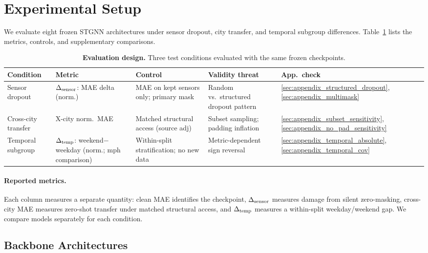 \section{Experimental Setup}
\label{sec:setup}

We evaluate eight frozen STGNN architectures under sensor dropout, city transfer, and temporal subgroup differences. Table~\ref{tab:audit_design} lists the metrics, controls, and supplementary comparisons.

\begin{table}[H]
\centering
\caption{\textbf{Evaluation design.} Three test conditions evaluated
with the same frozen checkpoints.}
\label{tab:audit_design}
\vskip 0.05in
\small
\begin{tabular}{p{2.3cm}p{2.6cm}p{2.6cm}p{2.8cm}p{1.5cm}}
\toprule
\textbf{Condition} & \textbf{Metric} & \textbf{Control} & \textbf{Validity threat} & \textbf{App.\ check} \\
\midrule
Sensor dropout &
  $\Delta_{\text{sensor}}$: MAE delta (norm.) &
  MAE on kept sensors only; primary mask &
  Random vs.\ structured dropout pattern &
  \ref{sec:appendix_structured_dropout}, \ref{sec:appendix_multimask} \\
Cross-city transfer &
  X-city norm.\ MAE &
  Matched structural access (source adj) &
  Subset sampling; padding inflation &
  \ref{sec:appendix_subset_sensitivity}, \ref{sec:appendix_no_pad_sensitivity} \\
Temporal subgroup &
  $\Delta_{\text{temp}}$: weekend$-$weekday (norm.; mph comparison) &
  Within-split stratification; no new data &
  Metric-dependent sign reversal &
  \ref{sec:appendix_temporal_absolute}, \ref{sec:appendix_temporal_cov} \\
\bottomrule
\end{tabular}
\end{table}

\paragraph{Reported metrics.}
Each column measures a separate quantity: clean MAE identifies the checkpoint,
$\Delta_{\text{sensor}}$ measures damage from silent zero-masking, cross-city MAE measures
zero-shot transfer under matched structural access, and $\Delta_{\text{temp}}$ measures
a within-split weekday/weekend gap. We compare models separately for each condition.

\subsection{Backbone Architectures}
\label{subsec:backbones}

